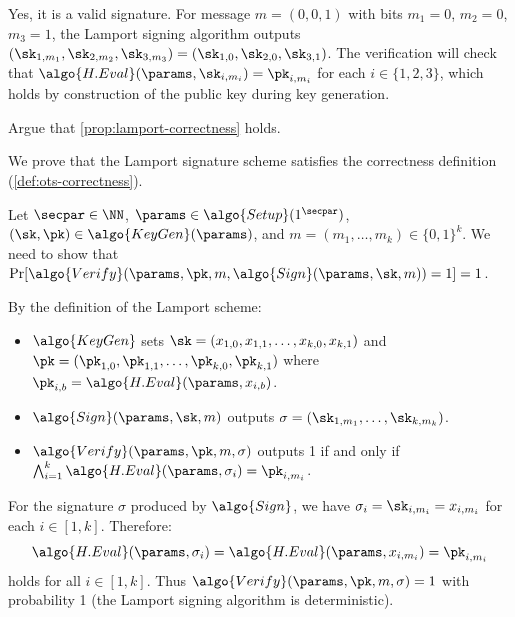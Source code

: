 \ifsolutions
\begin{mysolution}
  Yes, it is a valid signature.
  For message $m = (0, 0, 1)$ with bits $m_1 = 0$, $m_2 = 0$, $m_3 = 1$, the Lamport signing algorithm outputs $(\sk_{1,m_1}, \sk_{2,m_2}, \sk_{3,m_3}) = (\sk_{1,0}, \sk_{2,0}, \sk_{3,1})$.
  The verification will check that $\algo{H.Eval}(\params, \sk_{i,m_i}) = \pk_{i,m_i}$ for each $i \in \{1,2,3\}$, which holds by construction of the public key during key generation.
\end{mysolution}
\fi

\begin{exercise}\label{ex:lamport-correctness}
  Argue that \autoref{prop:lamport-correctness} holds.
\end{exercise}

\ifsolutions
\begin{mysolution}
  We prove that the Lamport signature scheme satisfies the correctness definition (\autoref{def:ots-correctness}).
  
  Let $\secpar \in \NN$, $\params \in \algo{Setup}(1^\secpar)$, $(\sk, \pk) \in \algo{KeyGen}(\params)$, and $m = (m_1, \ldots, m_k) \in \{0,1\}^k$.
  We need to show that $\Pr[\algo{Verify}(\params, \pk, m, \algo{Sign}(\params, \sk, m)) = 1] = 1$.
  
  By the definition of the Lamport scheme:
  \begin{itemize}
    \item $\algo{KeyGen}$ sets $\sk = (x_{1,0}, x_{1,1}, \ldots, x_{k,0}, x_{k,1})$ and $\pk = (\pk_{1,0}, \pk_{1,1}, \ldots, \pk_{k,0}, \pk_{k,1})$ where $\pk_{i,b} = \algo{H.Eval}(\params, x_{i,b})$.
    \item $\algo{Sign}(\params, \sk, m)$ outputs $\sigma = (\sk_{1,m_1}, \ldots, \sk_{k,m_k})$.
    \item $\algo{Verify}(\params, \pk, m, \sigma)$ outputs 1 if and only if $\bigwedge_{i=1}^k \algo{H.Eval}(\params, \sigma_i) = \pk_{i,m_i}$.
  \end{itemize}
  
  For the signature $\sigma$ produced by $\algo{Sign}$, we have $\sigma_i = \sk_{i,m_i} = x_{i,m_i}$ for each $i \in [1,k]$.
  Therefore:
  \[
    \algo{H.Eval}(\params, \sigma_i) = \algo{H.Eval}(\params, x_{i,m_i}) = \pk_{i,m_i}
  \]
  holds for all $i \in [1,k]$.
  Thus $\algo{Verify}(\params, \pk, m, \sigma) = 1$ with probability 1 (the Lamport signing algorithm is deterministic).
\end{mysolution}
\fi

